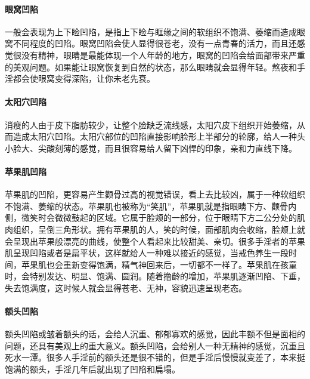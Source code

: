 \documentclass{ctexart}
\begin{document}
\paragraph{眼窝凹陷} 一般会表现为上下睑凹陷，是指上下睑与眶缘之间的软组织不饱满、萎缩而造成眼窝不同程度的凹陷。眼窝凹陷会使人显得很苍老，没有一点青春的活力，而且还感觉很没有精神，眼睛是最能体现一个人年龄的地方，眼窝的凹陷会给面部带来严重的美观问题。如果能让眼窝恢复到自然的状态，那么眼睛就会显得年轻。熬夜和手淫都会使眼窝变得深陷，让你未老先衰。

\paragraph{太阳穴凹陷} 消瘦的人由于皮下脂肪较少，让整个脸缺乏流线感，太阳穴皮下组织开始萎缩，从而造成太阳穴凹陷。太阳穴部位的凹陷直接影响脸形上半部分的轮廓，给人一种头小脸大、尖酸刻薄的感觉，而且很容易给人留下凶悍的印象，亲和力直线下降。

\paragraph{苹果肌凹陷} 苹果肌的凹陷，更容易产生颧骨过高的视觉错误，看上去比较凶，属于一种软组织不饱满、萎缩的状态。苹果肌也被称为“笑肌”，苹果肌就是指眼睛下方、颧骨内侧，微笑时会微微鼓起的区域。它属于脸颊的一部分，位于眼睛下方二公分处的肌肉组织，呈倒三角形状。拥有苹果肌的人，笑的时候，面部肌肉会收缩，脸颊上就会呈现出苹果般漂亮的曲线，使整个人看起来比较甜美、亲切。很多手淫者的苹果肌呈现凹陷或者是扁平状，这样就给人一种难以接近的感觉，当戒色养生一段时间，苹果肌也会重新变得饱满，精气神回来后，一切都不一样了。苹果肌在孩童时，会特别发达、明显、饱满、圆润。随着撸龄的增加，苹果肌逐渐凹陷、下垂，失去饱满度，这时候人就会显得苍老、无神，容貌迅速呈现老态。

\paragraph{额头凹陷} 额头凹陷或皱着额头的话，会给人沉重、郁郁寡欢的感觉，因此丰额不但是面相的问题，还具有美观上的重大意义。额头凹陷，会给别人一种无精神的感觉，沉重且死水一潭。很多人手淫前的额头还是很不错的，但是手淫后慢慢就变差了，本来挺饱满的额头，手淫几年后就出现了凹陷和扁塌。
\end{document}
